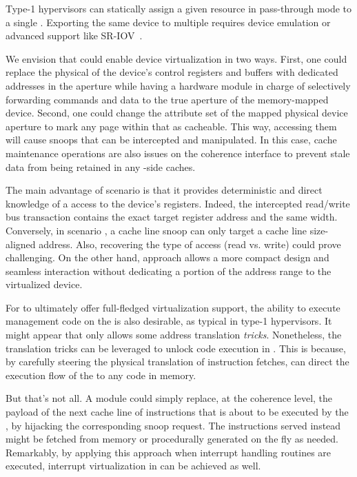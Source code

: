             Type-1 hypervisors can statically assign a given \io resource in pass-through mode to a single \vm. Exporting the same device to multiple  requires device emulation or advanced support like SR-IOV~\cite{sr_iov}.
            
            We envision that \sname could enable \io device virtualization in two ways. \ci First, one could replace the physical \pfn of the \io device's control registers and buffers with dedicated addresses in the \fpga aperture while having a hardware module in charge of selectively forwarding commands and data to the true aperture of the memory-mapped \io device.
            \cii Second, one could change the attribute set of the mapped physical device aperture to mark any page within that as cacheable. This way, accessing them will cause snoops that can be intercepted and manipulated. In this case, cache maintenance operations are also issues on the coherence interface to prevent stale data from being retained in any \cpu-side caches.
            
            The main advantage of scenario \ci is that it provides deterministic and direct knowledge of a  access to the device's registers. Indeed, the intercepted read/write bus transaction contains the exact target register address and the same width. Conversely, in scenario \cii, a cache line snoop can only target a cache line size-aligned address. Also, recovering the type of access (read vs. write) could prove challenging.       
            On the other hand, approach \cii allows a more compact design and seamless interaction without dedicating a portion of the \fpga address range to the virtualized device.
        
            For \sname to ultimately offer full-fledged virtualization support, the ability to execute management code on the \cpu is also desirable, as typical in type-1 hypervisors. It might appear that \sname only allows some address translation \emph{tricks}. Nonetheless, the translation tricks can be leveraged to unlock code execution in \sname. This is because, by carefully steering the physical translation of instruction fetches, \sname can direct the execution flow of the \cpu to any code in memory.
            
            But that's not all. A \sname module could simply replace, at the coherence level, the payload of the next cache line of instructions that is about to be executed by the \cpu, by hijacking the corresponding snoop request. The instructions served instead might be fetched from memory or procedurally generated on the fly as needed. Remarkably, by applying this approach when interrupt handling routines are executed, interrupt virtualization in \sname can be achieved as well.
            
